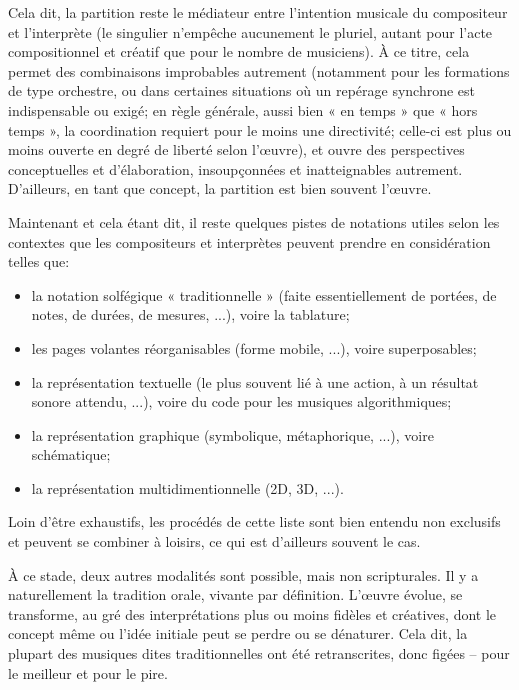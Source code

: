 \documentclass{article}
\begin{document}
Cela dit, la partition reste le médiateur entre l'intention musicale du compositeur et l'interprète (le singulier n'empêche aucunement le pluriel, autant pour l'acte compositionnel et créatif que pour le nombre de musiciens). À ce titre, cela permet des combinaisons improbables autrement (notamment pour les formations de type orchestre, ou dans certaines situations où un repérage synchrone est indispensable ou exigé; en règle générale, aussi bien « en temps » que « hors temps », la coordination requiert pour le moins une directivité; celle-ci est plus ou moins ouverte en degré de liberté selon l'œuvre), et ouvre des perspectives conceptuelles et d'élaboration, insoupçonnées et inatteignables autrement. D'ailleurs, en tant que concept, la partition est bien souvent l'œuvre.  

\bigskip

Maintenant et cela étant dit, il reste quelques pistes de notations utiles selon les contextes que les compositeurs et interprètes peuvent prendre en considération telles que:

\begin{itemize}
\item la notation solfégique « traditionnelle » (faite essentiellement de portées, de notes, de durées, de mesures, ...), voire la tablature;
\item les pages volantes réorganisables  (forme mobile, ...), voire superposables;
\item la représentation textuelle (le plus souvent lié à une action, à un résultat sonore attendu, ...), voire du code pour les musiques algorithmiques;
\item la représentation graphique (symbolique, métaphorique, ...), voire schématique;
\item la représentation multidimentionnelle (2D, 3D, ...).
\end{itemize}

Loin d'être exhaustifs, les procédés de cette liste sont bien entendu non exclusifs et peuvent se combiner à loisirs, ce qui est d'ailleurs souvent le cas.

\bigskip

À ce stade, deux autres modalités sont possible, mais non scripturales. Il y a naturellement la tradition orale, vivante par définition.  L'œuvre évolue, se transforme, au gré des interprétations plus ou moins fidèles et créatives, dont le concept même ou l'idée initiale peut se perdre ou se dénaturer. Cela dit, la plupart des musiques dites traditionnelles ont été retranscrites, donc figées -- pour le meilleur et pour le pire. 
\end{document}
